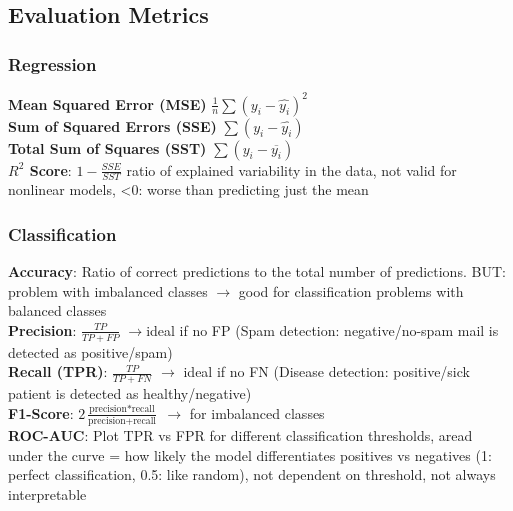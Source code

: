 \documentclass[english, threecolumn]{latex4ei/latex4ei_sheet}
\begin{document}
\begin{sectionbox}
\subsection{Evaluation Metrics}
\subsubsection{Regression}
\textbf{Mean Squared Error (MSE)} $\frac{1}{n}\sum (y_i - \hat{y_i})^2$\\
\textbf{Sum of Squared Errors (SSE)} $\sum (y_i - \hat{y_i})$\\
\textbf{Total Sum of Squares (SST)} $\sum (y_i - \overline{y_i})$\\
\textbf{$R^2$ Score}: $1-\frac{SSE}{SST}$ ratio of explained variability in the data, not valid for nonlinear models, <0: worse than predicting just the mean \\

\subsubsection{Classification}
\textbf{Accuracy}: Ratio of correct predictions to the total number of predictions. BUT: problem with imbalanced classes $\rightarrow$ good for classification problems with balanced classes\\
\textbf{Precision}: $\frac{TP}{TP+FP}$ $\rightarrow$ideal if no FP (Spam detection: negative/no-spam mail is detected as positive/spam)\\
\textbf{Recall (TPR)}: $\frac{TP}{TP+FN}$ $\rightarrow$ ideal if no FN (Disease detection: positive/sick patient is detected as healthy/negative)\\
\textbf{F1-Score}: $2\frac{\text{precision} * \text{recall}}{\text{precision} + \text{recall}}$ $\rightarrow$ for imbalanced classes\\
\textbf{ROC-AUC}: Plot TPR vs FPR for different classification thresholds, aread under the curve = how likely the model differentiates positives vs negatives (1: perfect classification, 0.5: like random), not dependent on threshold, not always interpretable\\


\end{sectionbox}
\end{document}
